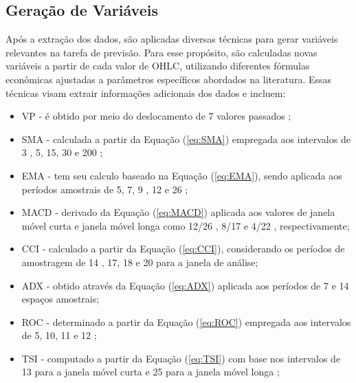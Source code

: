 \subsection{Geração de Variáveis}
\label{subsec:feature_generate}
Após a extração dos dados, são aplicadas diversas técnicas para gerar variáveis relevantes na tarefa de previsão. Para esse propósito, são calculadas novas variáveis a partir de cada valor de \ac{OHLC}, utilizando diferentes fórmulas econômicas ajustadas a parâmetros específicos abordados na literatura. Essas técnicas visam extrair informações adicionais dos dados e incluem:
\begin{itemize}
    \item \ac{VP} - é obtido por meio do deslocamento de 7 valores passados \cite{Vinícius_Sistemas};

    \item \ac{SMA} - calculada a partir da Equação (\ref{eq:SMA}) empregada aos intervalos de 3 \cite{chantarakasemchit2020forex}, 5, 15, 30 \cite{handayani2019longer} e 200 \cite{ELLIS2005399};
    
    \item \ac{EMA} - tem seu calculo baseado na Equação (\ref{eq:EMA}), sendo aplicada aos períodos amostrais de 5, 7, 9 \cite{ANBALAGAN2015214}, 12 \cite{Charlene} e 26 \cite{ananthi2021retracted};
    
    \item \ac{MACD} - derivado da Equação (\ref{eq:MACD}) aplicada aos valores de janela móvel curta e janela móvel longa como 12/26 \cite{ANBALAGAN2015214, handayani2019longer}, 8/17 e 4/22 \cite{kang2021improving}, respectivamente;
    
    \item \ac{CCI} - calculado a partir da Equação (\ref{eq:CCI}), considerando os períodos de amostragem de 14 \cite{halil2019predicting}, 17, 18 \cite{karasu2022crude} e 20 \cite{kelotra2020stock} para a janela de análise;
    
    \item \ac{ADX} - obtido através da Equação (\ref{eq:ADX}) aplicada aos períodos de 7 \cite{kelotra2020stock} e 14 \cite{shamseddin2022mapping} espaços amostrais;
    
    \item \ac{ROC} - determinado a partir da Equação (\ref{eq:ROC}) empregada aos intervalos de 5, 10, 11 e 12 \cite{karasu2022crude};
    
    \item \ac{TSI} - computado a partir da Equação (\ref{eq:TSI}) com base  nos intervalos de 13 para a janela móvel curta e 25 para a janela móvel longa \cite{nayak2015naive, anwar2019forecasting};
    

\end{itemize}
